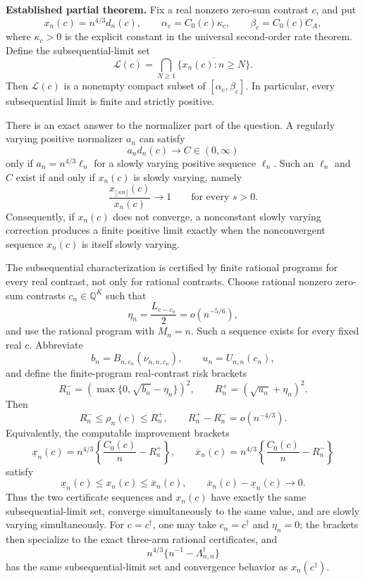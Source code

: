 \textbf{Established partial theorem.}
Fix a real nonzero zero-sum contrast \(c\), and put
\[
 x_n(c)=n^{4/3}d_n(c),\qquad
 \alpha_c=C_0(c)\kappa_c,\qquad
 \beta_c=C_0(c)C_A,
\]
where \(\kappa_c>0\) is the explicit constant in the universal second-order rate theorem.  Define the subsequential-limit set
\[
 \mathcal L(c)=\bigcap_{N\geq1}
 \overline{\{x_n(c):n\geq N\}}.
\]
Then \(\mathcal L(c)\) is a nonempty compact subset of \([\alpha_c,\beta_c]\).  In particular, every subsequential limit is finite and strictly positive.

There is an exact answer to the normalizer part of the question.  A regularly varying positive normalizer \(a_n\) can satisfy
\[
 a_nd_n(c)\longrightarrow C\in(0,\infty)
\]
only if \(a_n=n^{4/3}\ell_n\) for a slowly varying positive sequence \(\ell_n\).  Such an \(\ell_n\) and \(C\) exist if and only if \(x_n(c)\) is slowly varying, namely
\[
 \frac{x_{\lfloor sn\rfloor}(c)}{x_n(c)}\longrightarrow1
 \qquad\text{for every }s>0.
\]
Consequently, if \(x_n(c)\) does not converge, a nonconstant slowly varying correction produces a finite positive limit exactly when the nonconvergent sequence \(x_n(c)\) is itself slowly varying.

The subsequential characterization is certified by finite rational programs for every real contrast, not only for rational contrasts.  Choose rational nonzero zero-sum contrasts \(c_n\in\mathbb Q^K\) such that
\[
 \eta_n=\frac{L_{c-c_n}}2=o(n^{-5/6}),
\]
and use the rational program with \(M_n=n\).  Such a sequence exists for every fixed real \(c\).  Abbreviate
\[
 b_n=B_{n,c_n}(\nu_{n,n,c_n}),
 \qquad
 u_n=U_{n,n}(c_n),
\]
and define the finite-program real-contrast risk brackets
\[
 R_n^-=\left(\max\{0,\sqrt{b_n}-\eta_n\}\right)^2,
 \qquad
 R_n^+=\left(\sqrt{u_n}+\eta_n\right)^2.
\]
Then
\[
 R_n^-\leq\rho_n(c)\leq R_n^+,
 \qquad
 R_n^+-R_n^-=o(n^{-4/3}).
\]
Equivalently, the computable improvement brackets
\[
 \underline x_n(c)=n^{4/3}\left\{\frac{C_0(c)}n-R_n^+\right\},
 \qquad
 \overline x_n(c)=n^{4/3}\left\{\frac{C_0(c)}n-R_n^-\right\}
\]
satisfy
\[
 \underline x_n(c)\leq x_n(c)\leq\overline x_n(c),
 \qquad
 \overline x_n(c)-\underline x_n(c)\longrightarrow0.
\]
Thus the two certificate sequences and \(x_n(c)\) have exactly the same subsequential-limit set, converge simultaneously to the same value, and are slowly varying simultaneously.  For \(c=c^\dagger\), one may take \(c_n=c^\dagger\) and \(\eta_n=0\); the brackets then specialize to the exact three-arm rational certificates, and
\[
 n^{4/3}\{n^{-1}-\Lambda_{n,n}^\dagger\}
\]
has the same subsequential-limit set and convergence behavior as \(x_n(c^\dagger)\).

